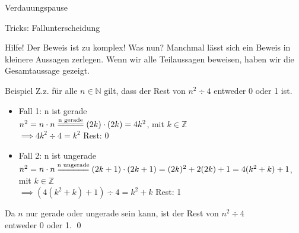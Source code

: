 \documentclass[10pt]{beamer}
\begin{document}
\begin{frame}[standout]
    Verdauungspause
\end{frame}

\begin{frame}[fragile]{Tricks: Fallunterscheidung}
    \begin{alertblock}{Hilfe! Der Beweis ist zu komplex! Was nun?}
        Manchmal lässt sich ein Beweis in kleinere Aussagen zerlegen. Wenn wir alle Teilaussagen beweisen, haben wir die Gesamtaussage gezeigt.
    \end{alertblock}
    \small\begin{exampleblock}{Beispiel}
        Z.z. für alle $n\in\mathbb{N}$ gilt, dass der Rest von $n^2 \div 4$ entweder 0 oder 1 ist.
        \footnotesize\begin{itemize}
            \item 
                \alert{Fall 1:} n ist gerade\\
                $n^2=n\cdot n\overset{\text{n gerade}}{=\joinrel=\joinrel=\joinrel=\joinrel=}(2k)\cdot(2k) = 4k^2$,  mit $k\in\mathbb{Z}$\\
                $\implies 4k^2 \div 4 = k^2$ Rest: 0
            \item \alert{Fall 2:} n ist ungerade\\
                $n^2=n\cdot n\overset{\text{n ungerade}}{=\joinrel=\joinrel=\joinrel=\joinrel=\joinrel=}(2k+1)\cdot(2k+1)=(2k)^2+2(2k)+1=4(k^2+k)+1$, \\mit $k\in\mathbb{Z}$\\
                $\implies (4(k^2+k)+1) \div 4= k^2+k$ Rest: 1
        \end{itemize}
        Da $n$ nur gerade oder ungerade sein kann, ist der Rest von $n^2\div4$ \\entweder 0 oder 1. \qed\;
    \end{exampleblock}
\end{frame}
\end{document}
